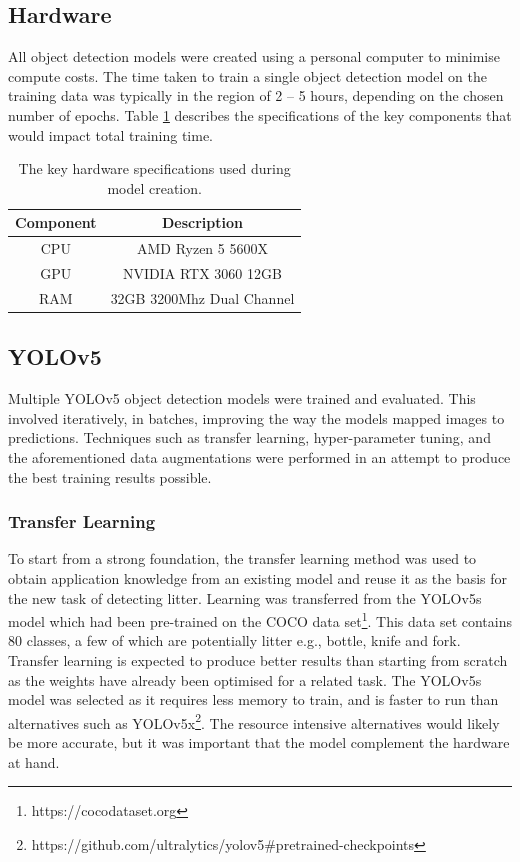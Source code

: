 \documentclass{thesis}
\begin{document}
\subsection{Hardware}

All object detection models were created using a personal computer to minimise compute costs. The time taken to train a single object detection model on the training data was typically in the region of 2 -- 5 hours, depending on the chosen number of epochs. Table \ref{table:hardware} describes the specifications of the key components that would impact total training time.

\begin{table}[ht!]
    \centering
    \begin{tabular}{|c| |c|} 
     \hline
     \textbf{Component} & \textbf{Description} \\ [0.5ex] 
     \hline\hline
     CPU & AMD Ryzen 5 5600X \\
     GPU & NVIDIA RTX 3060 12GB \\
     RAM & 32GB 3200Mhz Dual Channel  \\
     \hline
    \end{tabular}
    \hspace{100mm}
    \caption{The key hardware specifications used during model creation.}
    \label{table:hardware}
\end{table}

\subsection{YOLOv5}

Multiple YOLOv5 object detection models were trained and evaluated. This involved iteratively, in batches, improving the way the models mapped images to predictions. Techniques such as transfer learning, hyper-parameter tuning, and the aforementioned data augmentations were performed in an attempt to produce the best training results possible.

\subsubsection{Transfer Learning}

To start from a strong foundation, the transfer learning method was used to obtain application knowledge from an existing model and reuse it as the basis for the new task of detecting litter. Learning was transferred from the YOLOv5s model which had been pre-trained on the COCO data set\footnote{https://cocodataset.org}. This data set contains 80 classes, a few of which are potentially litter e.g., bottle, knife and fork. Transfer learning is expected to produce better results than starting from scratch as the weights have already been optimised for a related task. The YOLOv5s model was selected as it requires less memory to train, and is faster to run than alternatives such as YOLOv5x\footnote{https://github.com/ultralytics/yolov5\#pretrained-checkpoints}. The resource intensive alternatives would likely be more accurate, but it was important that the model complement the hardware at hand.
\end{document}

